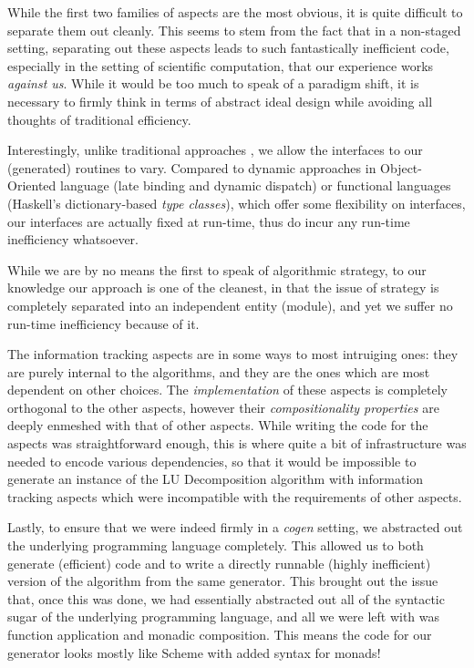\documentclass[draft]{elsart}
\begin{document}
While the first two families of aspects are the most obvious, it is quite
difficult to separate them out cleanly.  This seems to stem from the fact
that in a non-staged setting, separating out these aspects leads to such
fantastically inefficient code, especially in the setting of scientific
computation, that our experience works \emph{against us}.  While it would
be too much to speak of a paradigm shift, it is necessary to firmly think
in terms of abstract ideal design while avoiding all thoughts of traditional
efficiency.

Interestingly, unlike traditional approaches \cite{journals/cacm/parnas72a}, we
allow the interfaces to our (generated) routines to vary.  Compared to dynamic
approaches in Object-Oriented language (late binding and dynamic dispatch) or
functional languages (Haskell's dictionary-based \emph{type classes}), which
offer some flexibility on interfaces, our interfaces are actually fixed at
run-time, thus do incur any run-time inefficiency whatsoever.

While we are by no means the first to speak of algorithmic strategy, to
our knowledge our approach is one of the cleanest, in that the issue of
strategy is completely separated into an independent entity (module), and
yet we suffer no run-time inefficiency because of it.

The information tracking aspects are in some ways to most intruiging ones:
they are purely internal to the algorithms, and they are the ones which
are most dependent on other choices.  The \emph{implementation} of these
aspects is completely orthogonal to the other aspects, however their
\emph{compositionality properties} are deeply enmeshed with that of other
aspects.  While writing the code for the aspects was straightforward enough,
this is where quite a bit of infrastructure was needed to encode
various dependencies, so that it would be impossible to generate an
instance of the LU Decomposition algorithm with information
tracking aspects which were incompatible with the requirements of other
aspects.

Lastly, to ensure that we were indeed firmly in a \emph{cogen} setting,
we abstracted out the underlying programming language completely.  This 
allowed us to both generate (efficient) code and to write a directly
runnable (highly inefficient) version of the algorithm from the same
generator.  This brought out the issue that, once this was done, we had
essentially abstracted out all of the syntactic sugar of the underlying
programming language, and all we were left with was function application
and monadic composition.  This means the code for our generator looks mostly
like Scheme with added syntax for monads!
\end{document}

